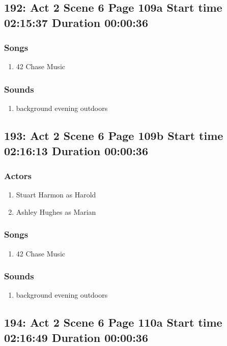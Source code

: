 \subsection{192: Act 2 Scene 6 Page 109a Start time 02:15:37 Duration 00:00:36}
\subsubsection{Songs}
\begin{enumerate}
\item 42 Chase Music
\end{enumerate}\subsubsection{Sounds}
\begin{enumerate}
\item background evening outdoors
\end{enumerate}
\subsection{193: Act 2 Scene 6 Page 109b Start time 02:16:13 Duration 00:00:36}

\subsubsection{Actors}
\begin{enumerate}
\item Stuart Harmon as Harold
\item Ashley Hughes as Marian
\end{enumerate}

\subsubsection{Songs}
\begin{enumerate}
\item 42 Chase Music
\end{enumerate}\subsubsection{Sounds}
\begin{enumerate}
\item background evening outdoors
\end{enumerate}
\subsection{194: Act 2 Scene 6 Page 110a Start time 02:16:49 Duration 00:00:36}

